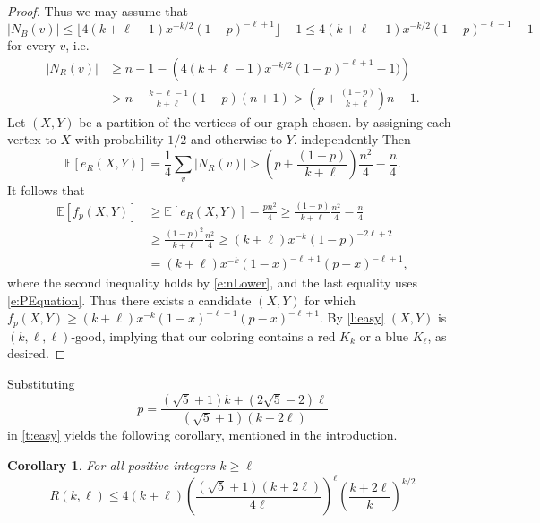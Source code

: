 \documentclass[reqno,final,12pt]{amsart}
\newtheorem{cor}[thm]{Corollary}
\newcommand{\bb}[1]{\mathbb{#1}}
\newcommand{\fs}[2]{\left(\frac{#1}{#2}\right)}
\newcommand{\s}[1]{\left(#1\right)}
\begin{document}
\begin{proof}
	Thus we may assume that $$|N_B(v)| \leq   \lfloor 4(k+\ell-1)x^{-k/2}(1-p)^{-\ell+1} \rfloor - 1  \leq 4(k+\ell-1)x^{-k/2}(1-p)^{-\ell+1} - 1$$ for every $v$, i.e. \begin{align*} |N_R(v)| &\geq n - 1 - \s{4(k+\ell-1)x^{-k/2}(1-p)^{-\ell+1} -1)} \\&> n - \frac{k+\ell-1}{k+\ell}(1-p)(n+1) > \s{p +\frac{(1-p)}{k+\ell}}n - 1. \end{align*} Let $(X,Y)$ be a  partition of the vertices of our graph chosen. by assigning each vertex to $X$ with probability $1/2$ and otherwise to $Y$. independently Then
	$$\bb{E}[e_R(X,Y)] = \frac{1}{4}\sum_{v}|N_R(v)| >  \s{p +\frac{(1-p)}{k+\ell}}\frac{n^2}{4} -\frac{n}{4}.$$ 
	It follows that 
	\begin{align*}\bb{E}[f_p(X,Y)] &\geq \bb{E}[e_R(X,Y)] -\frac{pn^2}{4} \geq \frac{(1-p)}{k+\ell}\frac{n^2}{4} -\frac{n}{4}\\& \geq \frac{(1-p)^2}{k+\ell}\frac{n^2}{4}	\geq (k+\ell)x^{-k}(1-p)^{-2\ell+2}\\&=  (k+\ell)x^{-k}(1-x)^{-\ell+1}(p-x)^{-\ell+1},
	\end{align*}
	where the second inequality holds by \eqref{e:nLower}, and the last equality uses \eqref{e:PEquation}. Thus there exists a candidate $(X,Y)$ for which $f_p(X,Y) \geq (k+\ell)x^{-k}(1-x)^{-\ell+1}(p-x)^{-\ell+1}$. By \cref{l:easy} $(X,Y)$ is $(k,\ell,\ell)$-good, implying that  our  coloring contains a red $K_k$ or a blue $K_\ell$, as desired.
\end{proof}	

Substituting $$p=\frac{(\sqrt{5}+1) k+(2\sqrt{5}-2)\ell}{\left(\sqrt{5}+1\right) (k+2 \ell)}$$ in \cref{t:easy} yields the following corollary, mentioned in the introduction.

\begin{cor}\label{c:easy}
	For all positive integers $k \geq \ell$ $$R(k,\ell) \leq 4(k+\ell)\fs{\left(\sqrt{5}+1\right) (k+2 \ell)}{4 \ell}^\ell \fs{k + 2\ell}{k}^{k/2} $$
\end{cor}
\end{document}
